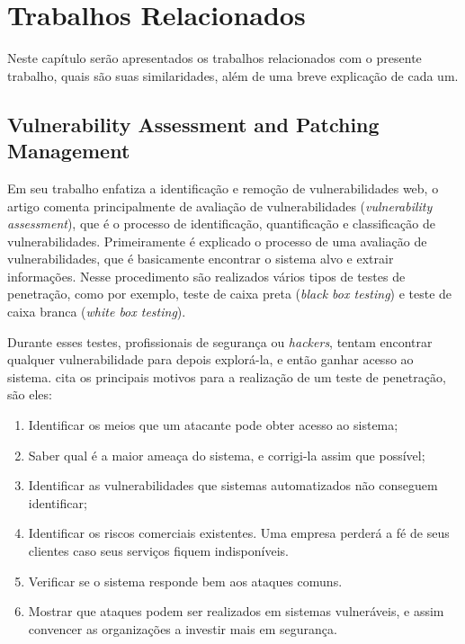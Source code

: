 \chapter{Trabalhos Relacionados}
\label{cap:trabalhos:relacionados}

Neste capítulo serão apresentados os trabalhos relacionados com o presente trabalho, quais são suas similaridades, além de uma breve explicação de cada um.

\section{Vulnerability Assessment and Patching Management}

Em seu trabalho  enfatiza a identificação e remoção de vulnerabilidades web, o artigo comenta principalmente de avaliação de vulnerabilidades (\textit{vulnerability assessment}), que é o processo de identificação, quantificação e classificação de vulnerabilidades. Primeiramente é explicado o processo de uma avaliação de vulnerabilidades, que é basicamente encontrar o sistema alvo e extrair informações. Nesse procedimento são realizados vários tipos de testes de penetração, como por exemplo, teste de caixa preta (\textit{black box testing}) e teste de caixa branca (\textit{white box testing}).

Durante esses testes, profissionais de segurança ou \textit{hackers}, tentam encontrar qualquer vulnerabilidade para depois explorá-la, e então ganhar acesso ao sistema.  cita os principais motivos para a realização de um teste de penetração, são eles:
\begin{enumerate}
    \item Identificar os meios que um atacante pode obter acesso ao sistema;
    \item Saber qual é a maior ameaça do sistema, e corrigi-la assim que possível;
    \item Identificar as vulnerabilidades que sistemas automatizados não conseguem identificar;
    \item Identificar os riscos comerciais existentes. Uma empresa perderá a fé de seus clientes caso seus serviços fiquem indisponíveis.
    \item Verificar se o sistema responde bem aos ataques comuns.
    \item Mostrar que ataques podem ser realizados em sistemas vulneráveis, e assim convencer as organizações a investir mais em segurança.
\end{enumerate}

